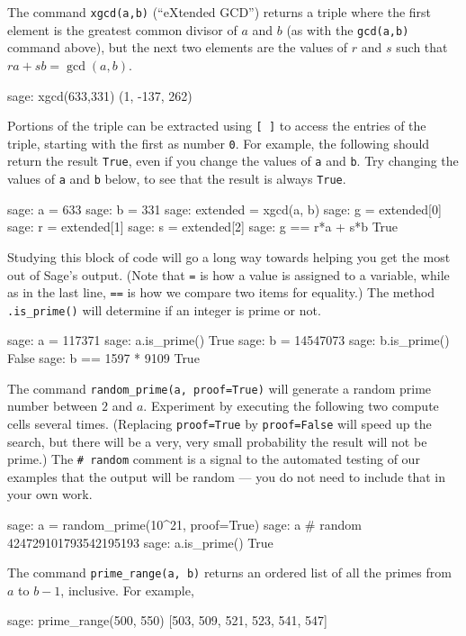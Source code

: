 %
The command \verb?xgcd(a,b)? (``eXtended GCD'') returns a triple where the first element is the greatest common divisor of $a$ and $b$ (as with the \verb?gcd(a,b)? command above), but the next two elements are the values of $r$ and $s$ such that $ra+sb=\gcd(a,b)$.
%
\begin{sageexample}
sage: xgcd(633,331)
(1, -137, 262)
\end{sageexample}
%
Portions of the triple can be extracted using \verb?[ ]? to access the entries of the triple, starting with the first as number \verb?0?.  For example, the following should return the result \verb?True?, even if you change the values of \verb?a? and \verb?b?.  Try changing the values of \verb?a? and \verb?b? below, to see that the result is always \verb?True?.\par
%
\begin{sageexample}
sage: a = 633
sage: b = 331
sage: extended = xgcd(a, b)
sage: g = extended[0]
sage: r = extended[1]
sage: s = extended[2]
sage: g == r*a + s*b
True
\end{sageexample}
%
Studying this block of code will go a long way towards helping you get the most out of Sage's output.  (Note that \verb?=? is how a value is assigned to a variable, while as in the last line, \verb?==? is how we compare two items for equality.)
%
%
%
The method \verb?.is_prime()? will determine if an integer is prime or not.
%
\begin{sageexample}
sage: a = 117371
sage: a.is_prime()
True
sage: b = 14547073
sage: b.is_prime()
False
sage: b == 1597 * 9109
True
\end{sageexample}
%
The command \verb?random_prime(a, proof=True)? will generate a random prime number between $2$ and $a$.
Experiment by executing the following two compute cells several times.  (Replacing \verb?proof=True? by \verb?proof=False? will speed up the search, but there will be a very, very small probability the result will not be prime.)  The \verb!# random! comment is a signal to the automated testing of our examples that the output will be random --- you do not need to include that in your own work.
%
\begin{sageexample}
sage: a = random_prime(10^21, proof=True)
sage: a                          # random
424729101793542195193
sage: a.is_prime()
True
\end{sageexample}
%
The command \verb?prime_range(a, b)? returns an ordered list of all the primes from $a$ to $b-1$, inclusive.  For example,
%
\begin{sageexample}
sage: prime_range(500, 550)
[503, 509, 521, 523, 541, 547]
\end{sageexample}
